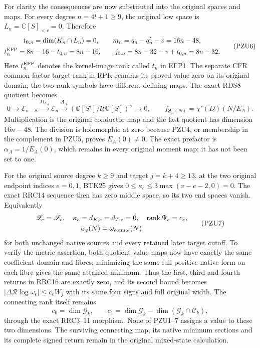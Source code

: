 For clarity the consequences are now substituted into the original
spaces and maps. For every degree $n=4l+1\ge9$, the original low
space is $L_n=\mathbb C[S]_{<v}=0$. Therefore
\[
 \begin{gathered}
 t_{0,n}=\dim(K_n\cap L_n)=0,\qquad
 m_n=q_n-q'_n-v=16n-48,\\
 t_n^{\rm EFP}=8n-16-t_{0,n}=8n-16,\qquad
 j_{0,n}=8n-32-v+t_{0,n}=8n-32.
 \end{gathered}\tag{PZU6}
\]
Here $t_n^{\rm EFP}$ denotes the kernel-image rank called $t_n$ in
EFP1. The separate CFR common-factor target rank in RPK remains its
proved value zero on its original domain; the two rank symbols have
different defining maps. The exact RDS8 quotient becomes
\[
 0\longrightarrow\mathscr E_{n-8}
   \xrightarrow{M_{E_A}}\mathscr E_n
   \xrightarrow{\mathfrak F_A}
       (\mathbb C[S']/\mathcal U\mathbb C[S])^\vee
   \longrightarrow0,
 \qquad f_{\mathfrak F_A(N)}=\chi'(D)(N/E_A).
\]
Multiplication is the original conductor map and the last quotient
has dimension $16n-48$. The division is holomorphic at zero because
PZU4, or membership in the complement in PZU5, proves $E_A(0)\ne0$.
The exact prefactor is $\alpha_A=1/E_A(0)$, which remains in every
original moment map; it has not been set to one.

For the original source degree $k\ge9$ and target $j=k+4\ge13$, at the two original endpoint indices $e=0,1$, BTK25 gives
$0\le\kappa_e\le3\max(v-e-2,0)=0$. The exact RRC14 sequence then
has zero middle space, so its two end spaces vanish. Equivalently
\[
 \begin{gathered}
 \mathscr Z_e=\mathscr S_e,\quad
 \kappa_e=d_{K,e}=d_{T,e}=0,\quad
 \operatorname{rank}\Psi_e=c_e,\\
 \omega_e(N)=\omega_{{\rm conn},e}(N)
 \end{gathered}\tag{PZU7}
\]
for both unchanged native sources and every retained later target
cutoff. To verify the metric assertion, both quotient-value maps now
have exactly the same coefficient domain and fibres; minimizing the
same full positive native form on each fibre gives the same attained
minimum. Thus the first, third and fourth returns in RRC16 are
exactly zero, and its second bound becomes
$|\Delta\mathcal R\log\omega_e|\le c_eW_j$ with its same four
signs and full original width. The connecting rank itself remains
\[
 c_0=\dim\mathcal G_k,\qquad
 c_1=\dim\mathcal G_k-\dim(\mathcal G_k\cap\mathcal C_k),
 \tag{PZU8}
\]
through the exact RRC3--11 morphism. None of PZU1--7 assigns a value
to these two dimensions. The surviving connecting map, its native
minimum sections and its complete signed return remain in the
original mixed-state calculation.



